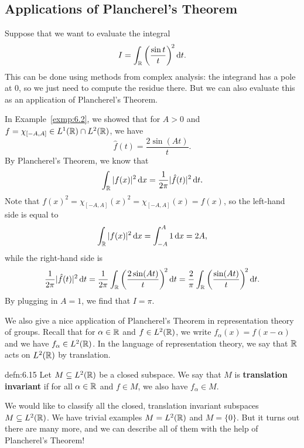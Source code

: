 \subsection{Applications of Plancherel's Theorem} \label{subsec:6.5}
Suppose that we want to evaluate the integral 
\[ I = \int_{\mathbb{R}} \left( \frac{\sin t}{t} \right)^{\!2}\textrm{d}t. \] 
This can be done using methods from complex analysis: the integrand has a 
pole at $0$, so we just need to compute the residue there. But we can 
also evaluate this as an application of Plancherel's Theorem. 

In Example~\ref{exmp:6.2}, we showed that for $A > 0$ and 
$f = \chi_{[-A, A]} \in L^1(\mathbb{R}) \cap L^2(\mathbb{R})$, we have 
\[ \hat f(t) = \frac{2\sin(At)}{t}. \] 
By Plancherel's Theorem, we know that 
\[ \int_{\mathbb{R}} |f(x)|^2 \,\mathrm{d} x = \frac{1}{2\pi} |\hat f(t)|^2 \,\mathrm{d} t. \] 
Note that $f(x)^2 = \chi_{[-A, A]}(x)^2 = \chi_{[-A, A]}(x) = f(x)$, 
so the left-hand side is equal to 
\[ \int_{\mathbb{R}} |f(x)|^2 \,\mathrm{d} x = \int_{-A}^A 1\,\mathrm{d} x = 2A, \] 
while the right-hand side is 
\[ \frac{1}{2\pi} |\hat f(t)|^2 \,\mathrm{d} t 
= \frac{1}{2\pi} \int_{\mathbb{R}} \left( \frac{2\sin(At)}{t} \right)^{\!2} \textrm{d}t 
= \frac{2}{\pi} \int_{\mathbb{R}} \left( \frac{\sin(At)}{t} \right)^{\!2} \textrm{d}t. \] 
By plugging in $A = 1$, we find that $I = \pi$. 

We also give a nice application of Plancherel's Theorem in representation 
theory of groups. Recall that for $\alpha \in \mathbb{R}$ and $f \in L^2(\mathbb{R})$, 
we write $f_\alpha(x) = f(x - \alpha)$ and we have $f_\alpha \in L^2(\mathbb{R})$. 
In the language of representation theory, we say that $\mathbb{R}$ 
acts on $L^2(\mathbb{R})$ by translation. 

\begin{defn}{defn:6.15}
    Let $M \subseteq L^2(\mathbb{R})$ be a closed subspace. We say that $M$ is
    {\bf translation invariant} if for all $\alpha \in \mathbb{R}$ and $f \in M$, 
    we also have $f_\alpha \in M$. 
\end{defn}

We would like to classify all the closed, translation invariant subspaces 
$M \subseteq L^2(\mathbb{R})$. We have trivial examples $M = L^2(\mathbb{R})$ and $M = \{0\}$. 
But it turns out there are many more, and we can describe all of them 
with the help of Plancherel's Theorem! 

